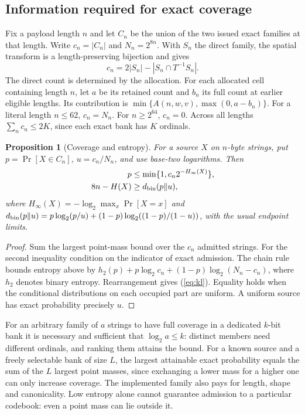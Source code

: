 \documentclass[10pt,twocolumn,letterpaper]{article}
\newtheorem{prop}{Proposition}
\begin{document}
\subsection{Information required for exact coverage}
Fix a payload length \(n\) and let \(C_n\) be the union of the two issued exact families at that length. Write \(c_n=|C_n|\) and \(N_n=2^{8n}\). With \(S_n\) the direct family, the spatial transform is a length-preserving bijection and gives
\[
 c_n=2|S_n|-|S_n\cap T^{-1}S_n|.
\]
The direct count is determined by the allocation. For each allocated cell containing length \(n\), let \(a\) be its retained count and \(b_n\) its full count at earlier eligible lengths. Its contribution is \(\min\{A(n,w,v),\max(0,a-b_n)\}\). For a literal length \(n\le62\), \(c_n=N_n\). For \(n\ge2^{64}\), \(c_n=0\). Across all lengths \(\sum_n c_n\le2K\), since each exact bank has \(K\) ordinals.
\begin{prop}[Coverage and entropy]
For a source \(X\) on \(n\)-byte strings, put \(p=\Pr[X\in C_n]\), \(u=c_n/N_n\), and use base-two logarithms. Then
\begin{align}
 p&\le\min\{1,c_n2^{-H_\infty(X)}\},\label{eq:minent}\\
 8n-H(X)&\ge d_{\rm bin}(p\Vert u),\label{eq:kl}
\end{align}
where \(H_\infty(X)=-\log_2\max_x\Pr[X=x]\) and \(d_{\rm bin}(p\Vert u)=p\log_2(p/u)+(1-p)\log_2((1-p)/(1-u))\), with the usual endpoint limits.
\end{prop}
\begin{proof}
Sum the largest point-mass bound over the \(c_n\) admitted strings. For the second inequality condition on the indicator of exact admission. The chain rule bounds entropy above by \(h_2(p)+p\log_2 c_n+(1-p)\log_2(N_n-c_n)\), where \(h_2\) denotes binary entropy. Rearrangement gives (\ref{eq:kl}). Equality holds when the conditional distributions on each occupied part are uniform. A uniform source has exact probability precisely \(u\).
\end{proof}
For an arbitrary family of \(a\) strings to have full coverage in a dedicated \(k\)-bit bank it is necessary and sufficient that \(\log_2 a\le k\): distinct members need different ordinals, and ranking them attains the bound. For a known source and a freely selectable bank of size \(L\), the largest attainable exact probability equals the sum of the \(L\) largest point masses, since exchanging a lower mass for a higher one can only increase coverage. The implemented family also pays for length, shape and canonicality. Low entropy alone cannot guarantee admission to a particular codebook: even a point mass can lie outside it.
\end{document}
